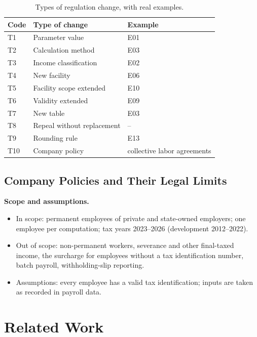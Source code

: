 \documentclass{ieeeaccess}
\begin{document}
\begin{table}[!t]
\caption{Types of regulation change, with real examples.}
\label{tab:jenis}
\centering\scriptsize
\begin{tabularx}{\columnwidth}{@{}lLl@{}}
\toprule
Code & Type of change & Example \\
\midrule
T1 & Parameter value & E01 \\
T2 & Calculation method & E03 \\
T3 & Income classification & E02 \\
T4 & New facility & E06 \\
T5 & Facility scope extended & E10 \\
T6 & Validity extended & E09 \\
T7 & New table & E03 \\
T8 & Repeal without replacement & -- \\
T9 & Rounding rule & E13 \\
T10 & Company policy & collective labor agreements \\
\bottomrule
\end{tabularx}
\end{table}

\lipsum[100] %

\subsection{Company Policies and Their Legal Limits}
\lipsum[19] \lipsum[20][1-3]

\textbf{Scope and assumptions.}
\begin{itemize}
\item In scope: permanent employees of private and state-owned employers; one employee per computation; tax years 2023--2026 (development 2012--2022).
\item Out of scope: non-permanent workers, severance and other final-taxed income, the surcharge for employees without a tax identification number, batch payroll, withholding-slip reporting.
\item Assumptions: every employee has a valid tax identification; inputs are taken as recorded in payroll data.
\end{itemize}

\lipsum[101] %

\section{Related Work}
\lipsum[21][1-3]
\lipsum[102] %
\end{document}
